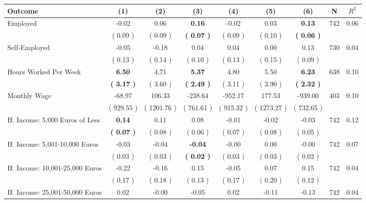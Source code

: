 \begin{tabular}{lcccccccc}
\toprule
 \textbf{Outcome} & \textbf{(1)} & \textbf{(2)} & \textbf{(3)} & \textbf{(4)} & \textbf{(5)} & \textbf{(6)} & \textbf{N} & \textbf{$ R^2$} \\
\midrule
Employed &     -0.02 &      0.06 & \textbf{     0.16} &     -0.02 &      0.03 & \textbf{     0.13} & 742 &       0.06 \\ 
 & (     0.09 ) & (     0.09 ) & \textbf{(     0.07 )} & (     0.09 ) & (     0.10 ) & \textbf{(     0.06 )} & \\
Self-Employed &     -0.05 &     -0.18 &      0.04 &      0.04 &      0.00 &      0.13 & 730 &       0.04 \\ 
 & (     0.13 ) & (     0.14 ) & (     0.10 ) & (     0.13 ) & (     0.15 ) & (     0.09 ) & \\
Hours Worked Per Week & \textbf{     6.50} &      4.71 & \textbf{     5.37} &      4.80 &      5.50 & \textbf{     6.23} & 638 &       0.10 \\ 
 & \textbf{(     3.17 )} & (     3.60 ) & \textbf{(     2.49 )} & (     3.11 ) & (     3.90 ) & \textbf{(     2.32 )} & \\
Monthly Wage &    -68.97 &    106.33 &   -238.64 &   -952.17 &    177.53 &   -939.00 & 403 &       0.10 \\ 
 & (   929.55 ) & (  1201.76 ) & (   761.61 ) & (   915.32 ) & (  1273.27 ) & (   732.65 ) & \\
H. Income: 5,000 Euros of Less & \textbf{     0.14} &      0.11 &      0.08 &     -0.01 &     -0.02 &     -0.03 & 742 &       0.12 \\ 
 & \textbf{(     0.07 )} & (     0.08 ) & (     0.06 ) & (     0.07 ) & (     0.08 ) & (     0.05 ) & \\
H. Income: 5,001-10,000 Euros &     -0.03 &     -0.04 & \textbf{    -0.04} &     -0.00 &      0.00 &     -0.00 & 742 &       0.07 \\ 
 & (     0.03 ) & (     0.03 ) & \textbf{(     0.02 )} & (     0.03 ) & (     0.03 ) & (     0.02 ) & \\
H. Income: 10,001-25,000 Euros &     -0.22 &     -0.16 &      0.15 &     -0.05 &      0.07 &      0.15 & 742 &       0.04 \\ 
 & (     0.17 ) & (     0.18 ) & (     0.13 ) & (     0.17 ) & (     0.20 ) & (     0.12 ) & \\
H. Income: 25,001-50,000 Euros &      0.02 &     -0.00 &     -0.05 &      0.02 &     -0.11 &     -0.13 & 742 &       0.04 \\ 

\end{tabular}
